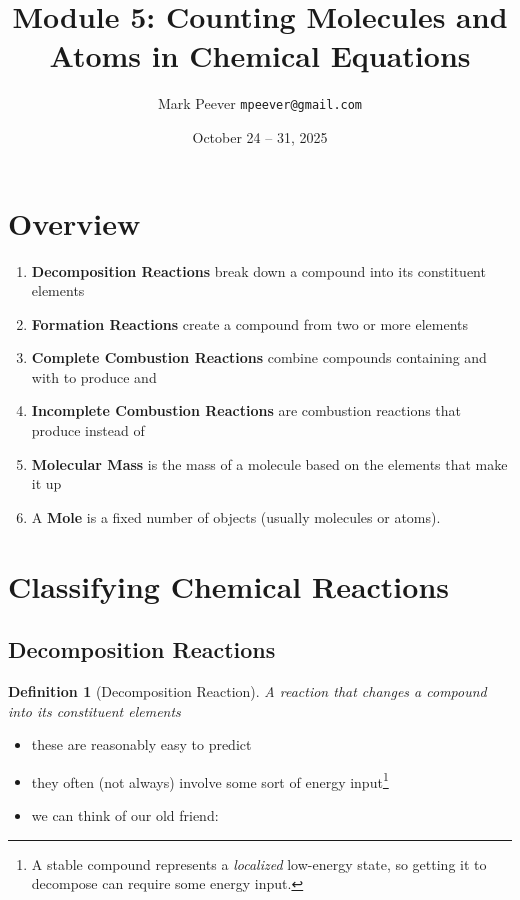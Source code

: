 \documentclass[11pt, oneside]{article}   	%
\title{Module 5: Counting Molecules and Atoms in Chemical Equations }
\author{Mark Peever \texttt{mpeever@gmail.com}}
\date{October 24 -- 31, 2025}
\newtheorem{definition}{Definition}
\begin{document}
\maketitle

\begin{center}

\end{center}

\section{Overview}
\begin{enumerate}
\item \textbf{Decomposition Reactions} break down a compound into its constituent elements
\item \textbf{Formation Reactions} create a compound from two or more elements
\item \textbf{Complete Combustion Reactions} combine compounds containing  and  with  to produce  and 
\item \textbf{Incomplete Combustion Reactions} are combustion reactions that produce  instead of 
\item \textbf{Molecular Mass} is the mass of a molecule based on the elements that make it up
\item A \textbf{Mole} is a fixed number of objects (usually molecules or atoms).
\end{enumerate}

\section{Classifying Chemical Reactions}

\subsection{Decomposition Reactions}

\begin{definition}[Decomposition Reaction]\label{defn:reaction:decomposition}
A reaction that changes a compound into its constituent elements
\end{definition}

\begin{itemize}
\item these are reasonably easy to predict
\item they often (not always) involve some sort of energy input\footnote{A stable compound represents a \emph{localized} low-energy state, so getting it to decompose can require some energy input.}
\item we can think of our old friend: 
\end{itemize} 
\end{document}
